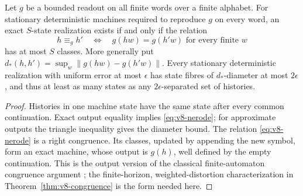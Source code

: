 \begin{corollary}\label{cor:v8-continuation}
Let $g$ be a bounded readout on all finite words over a finite alphabet.
For stationary deterministic machines required to reproduce $g$ on every
word, an exact $S$-state realization exists if and only if the relation
\begin{equation}
 h\equiv_g h'\quad\Longleftrightarrow\quad
                g(hw)=g(h'w)\text{ for every finite }w
                                                               \label{eq:v8-nerode}
\end{equation}
has at most $S$ classes. More generally put
$d_*(h,h')=\sup_w\|g(hw)-g(h'w)\|$. Every stationary deterministic
realization with uniform error at most $\epsilon$ has state fibres of
$d_*$-diameter at most $2\epsilon$, and thus at least as many states as
any $2\epsilon$-separated set of histories.
\end{corollary}
\begin{proof}
Histories in one machine state have the same state after every common
continuation. Exact output equality implies \eqref{eq:v8-nerode}; for
approximate outputs the triangle inequality gives the diameter bound.
The relation \eqref{eq:v8-nerode} is a right congruence. Its classes,
updated by appending the new symbol, form an exact machine, whose output
is $g(h)$, well defined by the empty continuation. This is the output
version of the classical finite-automaton congruence argument
\cite{Nerode1958}; the finite-horizon, weighted-distortion characterization
in Theorem~\ref{thm:v8-congruence} is the form needed here.
\end{proof}

